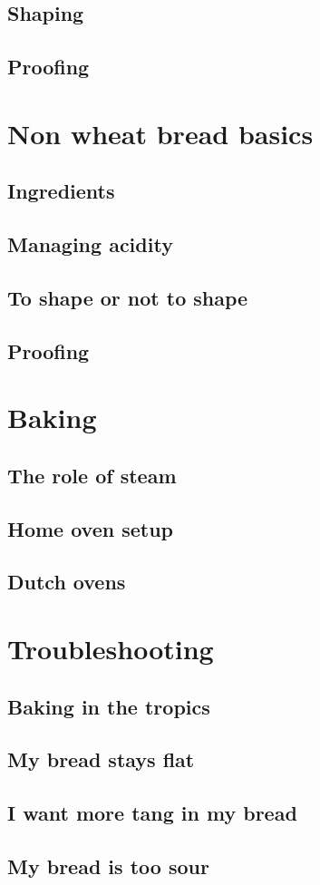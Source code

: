 \documentclass[a4paper, 12pt]{book}
\begin{document}
\section{Shaping}
\section{Proofing}

\chapter{Non wheat bread basics}
\section{Ingredients}
\section{Managing acidity}
\section{To shape or not to shape}
\section{Proofing}

\chapter{Baking}
\section{The role of steam}
\section{Home oven setup}
\section{Dutch ovens}

\chapter{Troubleshooting}
\section{Baking in the tropics}
\section{My bread stays flat}
\section{I want more tang in my bread}
\section{My bread is too sour}
\end{document}
